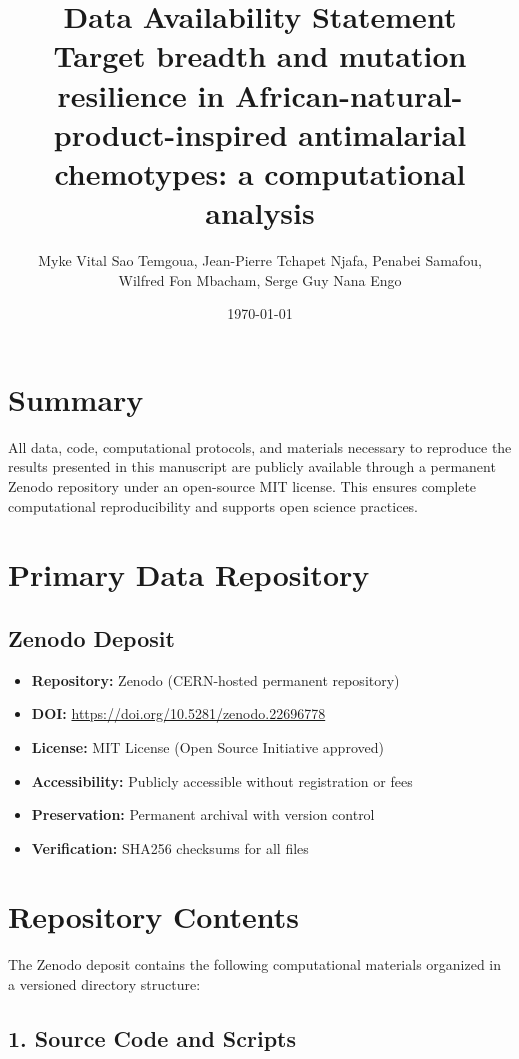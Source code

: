 \documentclass[11pt,a4paper]{article}
\title{\textbf{Data Availability Statement} \\[0.5em]
{\large Target breadth and mutation resilience in African-natural-product-inspired antimalarial chemotypes: a computational analysis}}
\author{
Myke Vital Sao Temgoua, Jean-Pierre Tchapet Njafa, Penabei Samafou, \\
Wilfred Fon Mbacham, Serge Guy Nana Engo
}
\date{\today}
\begin{document}
\maketitle

\section*{Summary}

All data, code, computational protocols, and materials necessary to reproduce the results presented in this manuscript are publicly available through a permanent Zenodo repository under an open-source MIT license. This ensures complete computational reproducibility and supports open science practices.

\section*{Primary Data Repository}

\subsection*{Zenodo Deposit}

\begin{itemize}[leftmargin=*]
\item \textbf{Repository:} Zenodo (CERN-hosted permanent repository)
\item \textbf{DOI:} \url{https://doi.org/10.5281/zenodo.22696778}
\item \textbf{License:} MIT License (Open Source Initiative approved)
\item \textbf{Accessibility:} Publicly accessible without registration or fees
\item \textbf{Preservation:} Permanent archival with version control
\item \textbf{Verification:} SHA256 checksums for all files
\end{itemize}

\section*{Repository Contents}

The Zenodo deposit contains the following computational materials organized in a versioned directory structure:

\subsection*{1. Source Code and Scripts}
\end{document}
